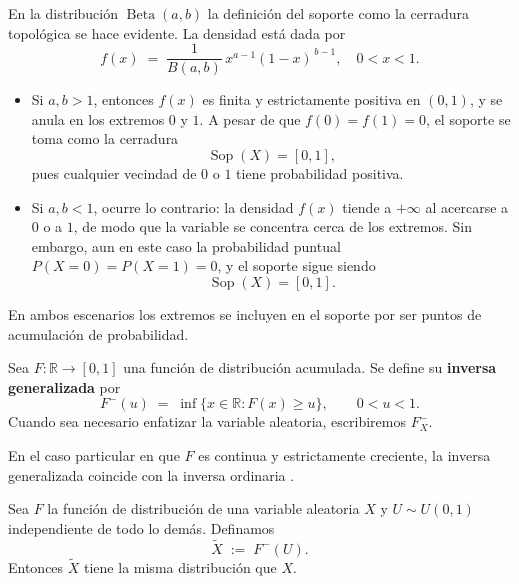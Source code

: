 \documentclass[../Main.tex]{subfiles}
\begin{document}
\begin{remark}
En la distribución $\operatorname{Beta}(a,b)$ la definición del soporte como la cerradura topológica se hace evidente.  
La densidad está dada por
\[
   f(x) \;=\; \frac{1}{B(a,b)} \, x^{a-1} (1-x)^{\,b-1}, \quad 0 < x < 1.
\]

\begin{itemize}
   \item Si $a,b>1$, entonces $f(x)$ es finita y estrictamente positiva en $(0,1)$, y se anula en los extremos $0$ y $1$.  
   A pesar de que $f(0)=f(1)=0$, el soporte se toma como la cerradura
   \[
      \operatorname{Sop}(X) = [0,1],
   \]
   pues cualquier vecindad de $0$ o $1$ tiene probabilidad positiva.

   \item Si $a,b<1$, ocurre lo contrario: la densidad $f(x)$ tiende a $+\infty$ al acercarse a $0$ o a $1$, de modo que la variable se concentra cerca de los extremos.  
   Sin embargo, aun en este caso la probabilidad puntual $P(X=0)=P(X=1)=0$, y el soporte sigue siendo
   \[
      \operatorname{Sop}(X) = [0,1].
   \]
\end{itemize}

En ambos escenarios los extremos se incluyen en el soporte por ser puntos de acumulación de probabilidad.
\end{remark}

\begin{definition}
Sea $F:\mathbb R\to[0,1]$ una función de distribución acumulada.
Se define su \textbf{inversa generalizada} por
\[
    F^{-}(u)\;=\;
    \inf\bigl\{x\in\mathbb R : F(x)\ge u\bigr\},
    \qquad 0<u<1.
\]
Cuando sea necesario enfatizar la variable aleatoria,
escribiremos $F_X^{-}$.
\end{definition}

\begin{remark}
En el caso particular en que $F$ es continua y estrictamente creciente,
la inversa generalizada coincide con la inversa ordinaria \cite{BaltazarLarios2024}.
\end{remark}

\begin{lemma}
Sea $F$ la función de distribución de una variable aleatoria $X$ y
$U\sim U(0,1)$ independiente de todo lo demás.
Definamos
\[
    \tilde X \;:=\; F^{-}(U).
\]
Entonces $\tilde X$ tiene la misma distribución que $X$.
\end{lemma}
\end{document}
